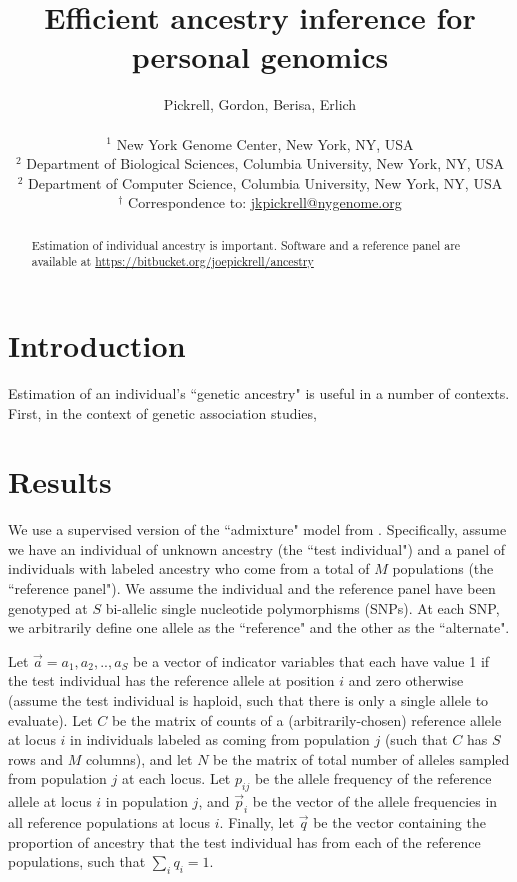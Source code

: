 \documentclass[11pt,titlepage]{article}
\begin{document}
\title{Efficient ancestry inference for personal genomics}
\author{Pickrell, Gordon, Berisa, Erlich\\ \\
\small $^1$ New York Genome Center, New York, NY, USA\\
\small $^2$ Department of Biological Sciences, Columbia University, New York, NY, USA \\
\small $^2$ Department of Computer Science, Columbia University, New York, NY, USA \\
\small $^\dagger$ Correspondence to: \url{jkpickrell@nygenome.org}
}
\maketitle
\begin{abstract}
Estimation of individual ancestry is important. Software and a reference panel are available at \url{https://bitbucket.org/joepickrell/ancestry}
\end{abstract}
\clearpage
\section{Introduction}
Estimation of an individual's ``genetic ancestry" is useful in a number of contexts. First, in the context of genetic association studies, 

\section{Results}
We use a supervised version of the ``admixture" model from \citet{Pritchard:2000zr}. 
Specifically, assume we have an individual of unknown ancestry (the ``test individual") and a panel of individuals with labeled ancestry who come from a total of $M$ populations (the ``reference panel"). 
We assume the individual and the reference panel have been genotyped at $S$ bi-allelic single nucleotide polymorphisms (SNPs).
 At each SNP, we arbitrarily define one allele as the ``reference" and the other as the ``alternate". 
 
 Let $\vec a = {a_1, a_2, .., a_S}$ be a vector of indicator variables that each have value 1 if the test individual has the reference allele at position $i$ and zero otherwise (assume the test individual is haploid, such that there is only a single allele to evaluate). 
Let $C$ be the matrix of counts of a (arbitrarily-chosen) reference allele at locus $i$ in individuals labeled as coming from population $j$ (such that $C$ has $S$ rows and $M$ columns), and let $N$ be the matrix of total number of alleles sampled from population $j$ at each locus. 
Let $p_{ij}$ be the allele frequency of the reference allele at locus $i$ in population $j$, and $\vec p_i$ be the vector of the allele frequencies in all reference populations at locus $i$. 
 Finally, let $\vec q$ be the vector containing the proportion of ancestry that the test individual has from each of the reference populations, such that $\sum_i q_i = 1$. 
\end{document}
